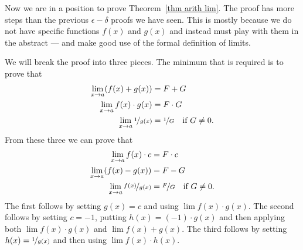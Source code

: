 Now we are in a position to prove Theorem~\ref{thm arith lim}. The proof has
more steps than the previous $\epsilon-\delta$ proofs we have
seen. This is mostly because we do not have specific functions $f(x)$ and
$g(x)$ and instead must play with them in the abstract --- and make good use of the
formal definition of limits.

We will break the proof into three pieces. The minimum that is required is to
prove that
\begin{align*}
  \lim_{x \to a} ( f(x) + g(x) ) &= F+G \\
  \lim_{x \to a} f(x) \cdot g(x) &= F\cdot G \\
  \lim_{x \to a} \nicefrac{1}{g(x)} &= \nicefrac{1}{G}\quad\text{if $G\ne 0$}.
\end{align*}
From these three we can prove that
\begin{align*}
  \lim_{x \to a} f(x) \cdot c &= F\cdot c \\
  \lim_{x \to a} ( f(x) - g(x) ) &= F-G \\
  \lim_{x \to a} \nicefrac{f(x)}{g(x)} &= \nicefrac{F}{G}\quad\text{if $G\ne 0$}.
\end{align*}
The first follows by setting $g(x) = c$ and using $\lim f(x) \cdot
g(x)$. The second follows by setting $c=-1$, putting $h(x) = (-1)\cdot g(x)$
and then applying both $\lim f(x) \cdot g(x)$ and $\lim f(x)+g(x)$. The third
follows by setting $h(x) = \nicefrac{1}{g(x)}$ and then using $\lim f(x) \cdot h(x)$.



